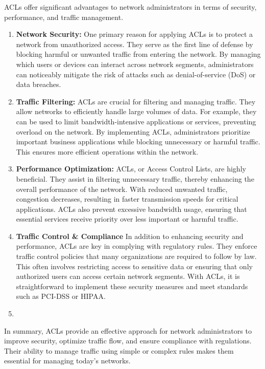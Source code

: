 \documentclass[11pt,a4paper]{article}
\begin{document}
  ACLs offer significant advantages to network administrators in terms of security, performance, and traffic management.

  \begin{enumerate}
    \item \textbf{Network Security:} One primary reason for applying ACLs is to protect a network from unauthorized access. They serve as the first line of defense by blocking harmful or unwanted traffic from entering the network. By managing which users or devices can interact across network segments, administrators can noticeably mitigate the risk of attacks such as denial-of-service (DoS) or data breaches.
    
    \item \textbf{Traffic Filtering:} ACLs are crucial for filtering and managing traffic. They allow networks to efficiently handle large volumes of data. For example, they can be used to limit bandwidth-intensive applications or services, preventing overload on the network. By implementing ACLs, administrators prioritize important business applications while blocking unnecessary or harmful traffic. This ensures more efficient operations within the network.
    
    \item \textbf{Performance Optimization:} ACLs, or Access Control Lists, are highly beneficial. They assist in filtering unnecessary traffic, thereby enhancing the overall performance of the network. With reduced unwanted traffic, congestion decreases, resulting in faster transmission speeds for critical applications. ACLs also prevent excessive bandwidth usage, ensuring that essential services receive priority over less important or harmful traffic.

    
    \item \textbf{Traffic Control \& Compliance} In addition to enhancing security and performance, ACLs are key in complying with regulatory rules. They enforce traffic control policies that many organizations are required to follow by law. This often involves restricting access to sensitive data or ensuring that only authorized users can access certain network segments. With ACLs, it is straightforward to implement these security measures and meet standards such as PCI-DSS or HIPAA.
    \item 
  \end{enumerate}

  In summary, ACLs provide an effective approach for network administrators to improve security, optimize traffic flow, and ensure compliance with regulations. Their ability to manage traffic using simple or complex rules makes them essential for managing today’s networks.



\newpage


\begin{multicols}{2}
    \small
    
    \makeatletter
  \renewcommand\@biblabel[1]{#1.} 
    
   
\end{multicols}
  
\end{document}
